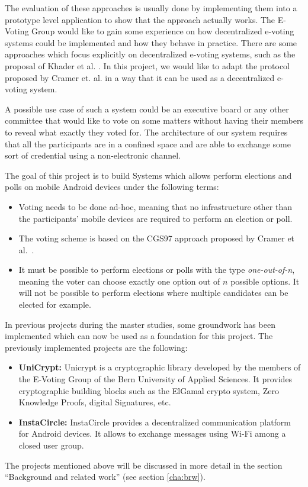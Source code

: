 \documentclass[numbers=noenddot, abstract=on, a4paper, headsepline,
footsepline, oneside, draft=off]{scrreprt}
\newcommand{\myref}[1]{(see section \vref{#1})}
\begin{document}
The evaluation of these approaches is usually done by implementing them into a
prototype level application to show that the approach actually works. The
E-Voting Group would like to gain some experience on how decentralized e-voting
systems could be implemented and how they behave in practice. There are some
approaches which focus explicitly on decentralized e-voting systems, such as the
proposal of Khader et al. \cite{HKRS12}. In this project, we would like to adapt
the protocol proposed by Cramer et. al. \cite{CGS97} in a way that it can be
used as a decentralized e-voting system.

A possible use case of such a system could be an executive board or any other
committee that would like to vote on some matters without having their members
to reveal what exactly they voted for. The architecture of our system requires
that all the participants are in a confined space and are able to exchange some
sort of credential using a non-electronic channel.

The goal of this project is to build Systems which allows perform elections and
polls on mobile Android devices under the following terms:
\begin{itemize}
  \item Voting needs to be done ad-hoc, meaning that no infrastructure other
  than the participants' mobile devices are required to perform an election or
  poll.
  \item The voting scheme is based on the CGS97 approach proposed by Cramer et
  al.~\cite{CGS97}.
  \item It must be possible to perform elections or polls with the type \emph{one-out-of-n},
  meaning the voter can choose exactly one option out of $n$ possible options.
  It will not be possible to perform elections where multiple candidates can be
  elected for example.
\end{itemize}

In previous projects during the master studies, some groundwork has been
implemented which can now be used as a foundation for this project. The
previously implemented projects are the following:
\begin{itemize}
  \item \textbf{UniCrypt:} Unicrypt is a cryptographic library developed by the
  members of the E-Voting Group of the Bern University of Applied Sciences. It
  provides cryptographic building blocks such as the ElGamal crypto system, Zero
  Knowledge Proofs, digital Signatures, etc. 
  \item \textbf{InstaCircle: } InstaCircle provides a decentralized
  communication platform for Android devices. It allows to exchange messages
  using Wi-Fi among a closed user group.
\end{itemize}
The projects mentioned above will be discussed in more detail in the section
``Background and related work'' \myref{cha:brw}.
\end{document}
